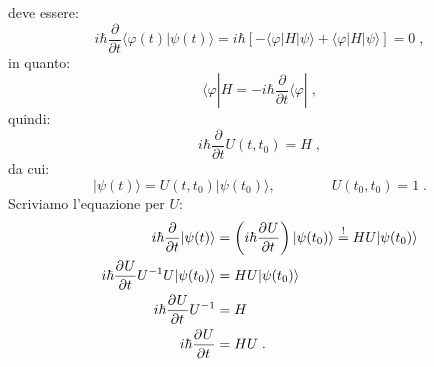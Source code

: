 \documentclass[10pt,a4paper]{report}
\theoremstyle{definition}
\newcommand{\pdev}[3][]{\frac{\partial^{#1} #2}{\partial #3^{#1}}}
\numberwithin{equation}{section}
\newcommand{\bra}{\langle}
\newcommand{\ket}{\rangle}
\begin{document}
deve essere:
\begin{equation}
i\hbar\frac{\partial}{\partial t}\bra\varphi(t)|\psi(t)\ket=i\hbar[-\bra\varphi|H|\psi\ket+\bra\varphi|H|\psi\ket]=0\;,
\end{equation}
in quanto:
$$
\bra\varphi|H=-i\hbar\frac{\partial}{\partial t}\bra\varphi|\;,
$$
quindi:
$$
i\hbar\frac{\partial}{\partial t}U(t,t_0)=H\;,
$$
da cui:
\begin{equation}
|\psi(t)\ket=U(t,t_0)|\psi(t_0)\ket, \qquad\qquad U(t_0,t_0)=1\;.
\end{equation}
Scriviamo l'equazione per $U$:
\begin{align}
i\hbar\frac{\partial}{\partial t}|\psi(t)\ket&=\left(i\hbar\pdev{U}{t}\right)|\psi(t_0)\ket\stackrel{!}{=}HU|\psi(t_0)\ket \notag \\
i\hbar\pdev{U}{t} U^{-1}U|\psi(t_0)\ket &= HU|\psi(t_0)\ket \notag \\
i\hbar\pdev{U}{t}U^{-1}&= H \notag \\
i\hbar\pdev{U}{t}&=HU\;.
\end{align}
\end{document}
